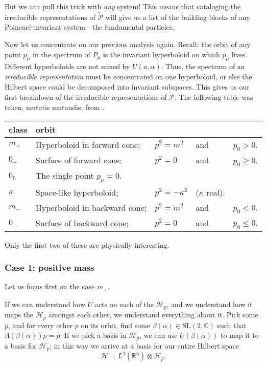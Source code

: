 \documentclass[a4paper,10pt]{scrreprt}
\newcommand{\R}{\mathbb{R}}
\newcommand{\C}{\mathbb{C}}
\newcommand{\SL}{\mathrm{SL}}
\theoremstyle{definition}
\theoremstyle{plain}
\theoremstyle{remark}
\begin{document}
But we can pull this trick with \emph{any} system! This means that cataloging the irreducible representations of $\widetilde{\mathcal{P}}$ will give us a list of the building blocks of any Poincar{\'e}-invariant system---the fundamental particles.

Now let us concentrate on our previous analysis again. Recall: the orbit of any point $p_{\mu}$ in the spectrum of $P_{\mu}$ is the invariant hyperboloid on which $p_{\mu}$ lives. Different hyperboloids are not mixed by $U(a, \alpha)$. Thus, the spectrum of an \emph{irreducible representation} must be concentrated on one hyperboloid, or else the Hilbert space could be decomposed into invariant subspaces. This gives us our first breakdown of the irreducible representations of $\widetilde{\mathcal{P}}$. The following table was taken, mutatis mutandis, from \cite{haag-local-quantum-physics}.

\begin{center}
  \begin{tabular}{l l l l l}
    class & orbit &  \\
    \hline
    $m_{+}$ & Hyperboloid in forward cone; & $p^{2} = m^{2}$ & and & $p_{0} > 0$. \\
    $0_{+}$ & Surface of forward cone; & $p^{2} = 0$ & and & $p_{0} \geq 0$. \\
    $0_{0}$ & The single point $p_{\mu} = 0$. \\
    $\kappa$ & Space-like hyperboloid; & $p^{2} = -\kappa^{2}$ & ($\kappa$ real). \\
    $m_{-}$ & Hyperboloid in backward cone; & $p^{2} = m^{2}$ & and & $p_{0} < 0$. \\
    $0_{-}$ & Surface of backward cone; & $p^{2} = 0$ & and & $p_{0} \leq 0$. \\
    \hline
  \end{tabular}
\end{center}
Only the first two of these are physically interesting.

\subsubsection{Case 1: positive mass}
Let us focus first on the case $m_{+}$.

If we can understand how $U$ acts on each of the $\mathscr{H}_{p}$, and we understand how it maps the $\mathscr{H}_{p}$ amongst each other, we understand everything about it. Pick some $\bar{p}$, and for every other $p$ on its orbit, find some $\beta(\alpha) \in \SL(2, \C)$ such that $\Lambda(\beta(\alpha))\bar{p} = p$. If we pick a basis in $\mathscr{H}_{\bar{p}}$, we can use $U(\beta(\alpha))$ to map it to a basis for $\mathscr{H}_{p}$; in this way we arrive at a basis for our entire Hilbert space 
\begin{equation*}
  \mathscr{H} = L^{2}(\R^{3}) \otimes \mathscr{H}_{\bar{p}}.
\end{equation*}
\end{document}

